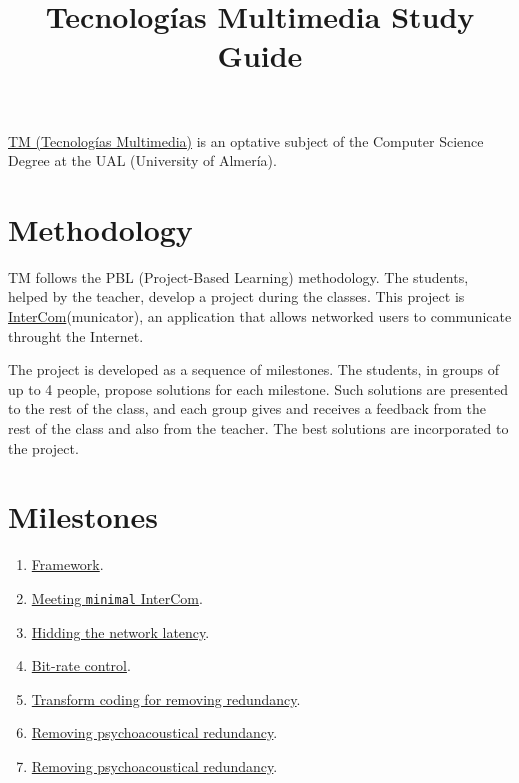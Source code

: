 
\title{Tecnologías Multimedia \newline Study Guide}

\maketitle

\href{https://www.ual.es/estudios/grados/presentacion/plandeestudios/asignatura/4015/40154321}{TM
  (Tecnologías Multimedia)} is an optative subject of the Computer
Science Degree at the UAL (University of Almería).

\section{Methodology}
TM follows the PBL (Project-Based Learning) methodology. The students,
helped by the teacher, develop a project during the classes. This
project
is \href{https://github.com/Tecnologias-multimedia/intercom}{InterCom}(municator),
an application that allows networked users to communicate throught
the Internet.

The project is developed as a sequence of milestones. The students, in
groups of up to 4 people, propose solutions for each milestone. Such
solutions are presented to the rest of the class, and each group gives
and receives a feedback from the rest of the class and also from the
teacher. The best solutions are incorporated to the project.

\section{Milestones}

\begin{enumerate}
\item \href{https://tecnologias-multimedia.github.io/study_guide/framework/}{Framework}.
\item \href{https://tecnologias-multimedia.github.io/study_guide/minimal/}{Meeting \texttt{minimal} InterCom}.
\item \href{https://tecnologias-multimedia.github.io/study_guide/latency/}{Hidding the network latency}.
\item \href{https://tecnologias-multimedia.github.io/study_guide/BR_control/}{Bit-rate control}.
\item \href{https://tecnologias-multimedia.github.io/study_guide/transform_coding/}{Transform coding for removing redundancy}.
\item \href{https://tecnologias-multimedia.github.io/study_guide/perceptual_coding/}{Removing psychoacoustical redundancy}.
\item \href{https://tecnologias-multimedia.github.io/study_guide/psychoacoustics/}{Removing psychoacoustical redundancy}.
\end{enumerate}


